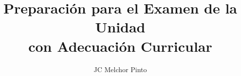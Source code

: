 \documentclass[12pt,addpoints]{repaso}
\title{Preparación para el Examen de la Unidad\\con Adecuación Curricular}
\author{JC Melchor Pinto}
\begin{document}
\INFO%
\begin{multicols}{2}%
    
    
    
\end{multicols}%
\begin{questions}
    \questionboxed[15]{}
    \ejemplosboxed[]
    \questionboxed[15]{}
    \ejemplosboxed[]
    \questionboxed[5]{}
    \ejemplosboxed[]
    \questionboxed[5]{}
    \questionboxed[5]{}
    \questionboxed[5]{}
    \ejemplosboxed[]
    \questionboxed[10]{}
    \questionboxed[10]{}
    \questionboxed[10]{}
    \ejemplosboxed[ ]
    \questionboxed[5]{}
    \questionboxed[5]{}
    \questionboxed[5]{}
    \questionboxed[5]{}
\end{questions}
\end{document}
